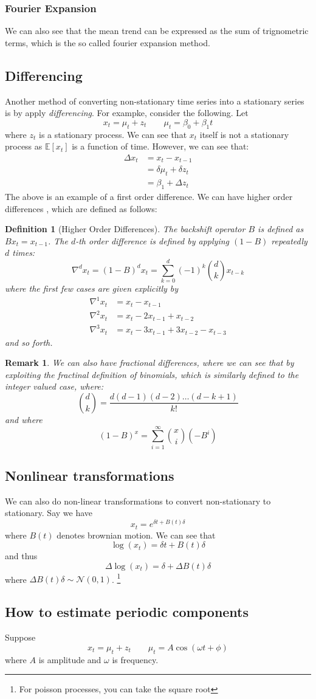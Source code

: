 \documentclass[12pt]{article}
\newtheorem{definition}{Definition}
\newtheorem{remark}{Remark}
\newcommand{\E}{\mathbb{E}}
\begin{document}
\subsubsection{Fourier Expansion}
We can also see that the mean trend can be expressed as the sum of trignometric terms, which is the so called fourier expansion method. 
\subsection{Differencing}
Another method of converting non-stationary time series into a stationary series is by apply \emph{differencing}. For exampke, consider the following. Let 
\[
	x_t = \mu_t + z_t \qquad \mu_t = \beta_0 + \beta_1 t 
\]
where $z_t$ is a stationary process. We can see that $x_t$ itself is not a stationary process as $\E[x_t]$ is a function of time. However, we can see that:
\begin{align*}
	\Delta x_t &= x_t - x_{t-1} \\ 
		   &= \delta \mu_t + \delta z_t \\ 
		   &= \beta_1 + \Delta z_t 
\end{align*}
The above is an example of a first order difference. We can have higher order differences , which are defined as follows:
\begin{definition}[Higher Order Differences]
The backshift operator $B$ is defined as $Bx_t = x_{t-1}$. The $d$-th order difference is defined by applying $(1-B)$ repeatedly $d$ times:
\[
\nabla^d x_t = (1-B)^d x_t = \sum_{k=0}^{d} (-1)^k \binom{d}{k} x_{t-k}
\]
where the first few cases are given explicitly by
\begin{align*}
\nabla^1 x_t &= x_t - x_{t-1} \\
\nabla^2 x_t &= x_t - 2x_{t-1} + x_{t-2} \\
\nabla^3 x_t &= x_t - 3x_{t-1} + 3x_{t-2} - x_{t-3}
\end{align*}
and so forth. 
\end{definition}
\begin{remark}
We can also have fractional differences, where we can see that by exploiting the fractinal definition of binomials, which is similarly defined to the integer valued case, where:
\[
	\binom{d}{k} = \frac{d(d-1)(d-2)\dots(d-k+1)}{k!} 
\]
and where 
\[
(1 - B)^x = \sum_{i = 1}^\infty \binom{x}{i}(-B^i)
\]
\end{remark}
\subsection{Nonlinear transformations}
We can also do non-linear transformations to convert non-stationary to stationary. Say we have 
\[
	x_t = e^{\delta t + B(t) \delta} 
\]
where $B(t)$ denotes brownian motion. We can see that 
\[
	\log(x_t) = \delta t + B(t) \delta 
\]
and thus 
\[
	\Delta \log(x_t) = \delta + \Delta B(t) \delta
\]
where $\Delta B(t) \delta \sim \mathcal{N}(0,1)$. \footnote{For poisson processes, you can take the square root}
\subsection{How to estimate periodic components}
Suppose 
\[
	x_t = \mu_t + z_t \qquad \mu_t = A\cos(\omega t  + \phi)
\]
where $A$ is amplitude and $\omega$ is frequency. 
\end{document}
